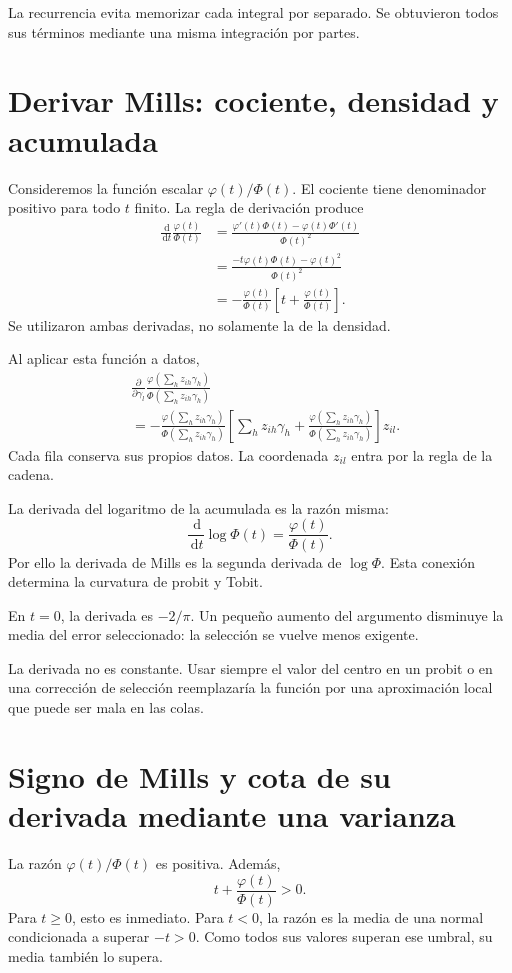 \documentclass[11pt,a4paper]{article}
\newcommand{\dd}{\,\mathrm d}
\begin{document}
La recurrencia evita memorizar
cada integral por separado.
Se obtuvieron todos sus términos
mediante una misma integración por partes.

\clearpage
\section{Derivar Mills: cociente, densidad y acumulada}\label{unidad70}
Consideremos la función escalar
\(\varphi(t)/\Phi(t)\).
El cociente tiene denominador positivo
para todo \(t\) finito.
La regla de derivación produce
\[
\begin{aligned}
\frac{\dd}{\dd t}\frac{\varphi(t)}{\Phi(t)}
&=\frac{\varphi'(t)\Phi(t)-\varphi(t)\Phi'(t)}{\Phi(t)^2}\\
&=\frac{-t\varphi(t)\Phi(t)-\varphi(t)^2}{\Phi(t)^2}\\
&=-\frac{\varphi(t)}{\Phi(t)}
\left[t+\frac{\varphi(t)}{\Phi(t)}\right].
\end{aligned}
\]
Se utilizaron ambas derivadas,
no solamente la de la densidad.

Al aplicar esta función a datos,
\[
\begin{aligned}
&\frac{\partial}{\partial\gamma_l}
\frac{\varphi(\sum_hz_{ih}\gamma_h)}
{\Phi(\sum_hz_{ih}\gamma_h)}\\
&=-\frac{\varphi(\sum_hz_{ih}\gamma_h)}
{\Phi(\sum_hz_{ih}\gamma_h)}
\left[
\sum_hz_{ih}\gamma_h+
\frac{\varphi(\sum_hz_{ih}\gamma_h)}
{\Phi(\sum_hz_{ih}\gamma_h)}
\right]z_{il}.
\end{aligned}
\]
Cada fila conserva sus propios datos.
La coordenada \(z_{il}\) entra
por la regla de la cadena.

La derivada del logaritmo de la acumulada
es la razón misma:
\[
\frac{\dd}{\dd t}\log\Phi(t)=\frac{\varphi(t)}{\Phi(t)}.
\]
Por ello la derivada de Mills
es la segunda derivada de \(\log\Phi\).
Esta conexión determina
la curvatura de probit y Tobit.

\begin{ejemplo}[Centro]
En \(t=0\), la derivada es \(-2/\pi\).
Un pequeño aumento del argumento
disminuye la media del error seleccionado:
la selección se vuelve menos exigente.
\end{ejemplo}
La derivada no es constante.
Usar siempre el valor del centro
en un probit o en una corrección de selección
reemplazaría la función por
una aproximación local que
puede ser mala en las colas.

\clearpage
\section{Signo de Mills y cota de su derivada mediante una varianza}\label{unidad71}
La razón \(\varphi(t)/\Phi(t)\) es positiva.
Además,
\[
t+\frac{\varphi(t)}{\Phi(t)}>0.
\]
Para \(t\ge0\), esto es inmediato.
Para \(t<0\), la razón es
la media de una normal condicionada
a superar \(-t>0\).
Como todos sus valores superan
ese umbral, su media también lo supera.
\end{document}
